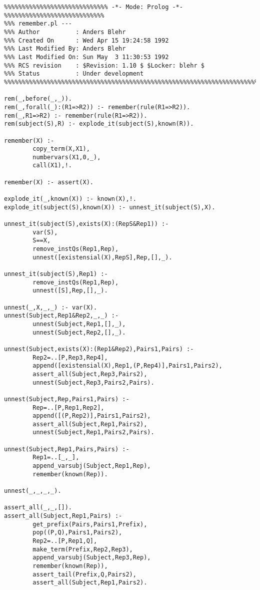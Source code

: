 \begin{verbatim}
%%%%%%%%%%%%%%%%%%%%%%%%%%%%% -*- Mode: Prolog -*- %%%%%%%%%%%%%%%%%%%%%%%%%%%%
%%% remember.pl --- 
%%% Author          : Anders Blehr
%%% Created On      : Wed Apr 15 19:24:58 1992
%%% Last Modified By: Anders Blehr
%%% Last Modified On: Sun May  3 11:30:53 1992
%%% RCS revision    : $Revision: 1.10 $ $Locker: blehr $
%%% Status          : Under development
%%%%%%%%%%%%%%%%%%%%%%%%%%%%%%%%%%%%%%%%%%%%%%%%%%%%%%%%%%%%%%%%%%%%%%%%%%%%%%

rem(_,before(_,_)).
rem(_,forall(_):(R1=>R2)) :- remember(rule(R1=>R2)).
rem(_,R1=>R2) :- remember(rule(R1=>R2)).
rem(subject(S),R) :- explode_it(subject(S),known(R)).

remember(X) :-
        copy_term(X,X1),
        numbervars(X1,0,_),
        call(X1),!.

remember(X) :- assert(X).

explode_it(_,known(X)) :- known(X),!.
explode_it(subject(S),known(X)) :- unnest_it(subject(S),X).

unnest_it(subject(S),exists(X):(RepS&Rep1)) :-
        var(S),
        S==X,
        remove_instQs(Rep1,Rep),
        unnest([existensial(X),RepS],Rep,[],_).

unnest_it(subject(S),Rep1) :- 
        remove_instQs(Rep1,Rep),
        unnest([S],Rep,[],_).

unnest(_,X,_,_) :- var(X).
unnest(Subject,Rep1&Rep2,_,_) :-
        unnest(Subject,Rep1,[],_),
        unnest(Subject,Rep2,[],_).

unnest(Subject,exists(X):(Rep1&Rep2),Pairs1,Pairs) :-
        Rep2=..[P,Rep3,Rep4],
        append([existensial(X),Rep1,(P,Rep4)],Pairs1,Pairs2),
        assert_all(Subject,Rep3,Pairs2),
        unnest(Subject,Rep3,Pairs2,Pairs).

unnest(Subject,Rep,Pairs1,Pairs) :-
        Rep=..[P,Rep1,Rep2],
        append([(P,Rep2)],Pairs1,Pairs2),
        assert_all(Subject,Rep1,Pairs2),
        unnest(Subject,Rep1,Pairs2,Pairs).

unnest(Subject,Rep1,Pairs,Pairs) :-
        Rep1=..[_,_],
        append_varsubj(Subject,Rep1,Rep),
        remember(known(Rep)).

unnest(_,_,_,_).

assert_all(_,_,[]).
assert_all(Subject,Rep1,Pairs) :-
        get_prefix(Pairs,Pairs1,Prefix),
        pop((P,Q),Pairs1,Pairs2),
        Rep2=..[P,Rep1,Q],
        make_term(Prefix,Rep2,Rep3),
        append_varsubj(Subject,Rep3,Rep),
        remember(known(Rep)),
        assert_tail(Prefix,Q,Pairs2),
        assert_all(Subject,Rep1,Pairs2).


\end{verbatim}
